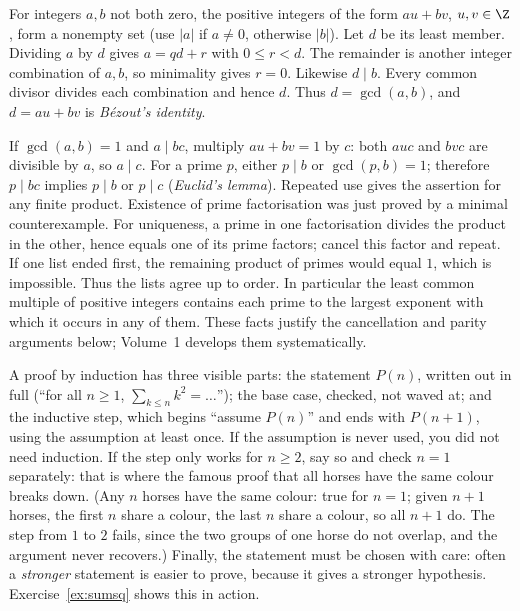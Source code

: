 For integers $a,b$ not both zero, the positive integers of the form $au+bv$, $u,v\in\Z$, form a nonempty set (use $|a|$ if $a\ne0$, otherwise $|b|$). Let $d$ be its least member. Dividing $a$ by $d$ gives $a=qd+r$ with $0\le r<d$. The remainder is another integer combination of $a,b$, so minimality gives $r=0$. Likewise $d\mid b$. Every common divisor divides each combination and hence $d$. Thus $d=\gcd(a,b)$, and $d=au+bv$ is \emph{B\'ezout's identity}.

If $\gcd(a,b)=1$ and $a\mid bc$, multiply $au+bv=1$ by $c$: both $auc$ and $bvc$ are divisible by $a$, so $a\mid c$. For a prime $p$, either $p\mid b$ or $\gcd(p,b)=1$; therefore $p\mid bc$ implies $p\mid b$ or $p\mid c$ (\emph{Euclid's lemma}). Repeated use gives the assertion for any finite product. Existence of prime factorisation was just proved by a minimal counterexample. For uniqueness, a prime in one factorisation divides the product in the other, hence equals one of its prime factors; cancel this factor and repeat. If one list ended first, the remaining product of primes would equal $1$, which is impossible. Thus the lists agree up to order. In particular the least common multiple of positive integers contains each prime to the largest exponent with which it occurs in any of them. These facts justify the cancellation and parity arguments below; Volume~1 develops them systematically.

\begin{reminder}
A proof by induction has three visible parts: the statement $P(n)$, written out in full (``for all $n\ge1$, $\sum_{k\le n}k^2=\dots$''); the base
case, checked, not waved at; and the inductive step, which begins ``assume $P(n)$'' and ends with $P(n+1)$, using the assumption at least once. If
the assumption is never used, you did not need induction. If the step only works for $n\ge2$, say so and check $n=1$ separately: that is where the
famous proof that all horses have the same colour breaks down. (Any $n$ horses have the same colour: true for $n=1$; given $n+1$ horses, the first $n$
share a colour, the last $n$ share a colour, so all $n+1$ do. The step from $1$ to $2$ fails, since the two groups of one horse do not overlap, and
the argument never recovers.) Finally, the statement must be chosen with care: often a \emph{stronger} statement is easier to prove, because it gives a
stronger hypothesis. Exercise~\ref{ex:sumsq} shows this in action.
\end{reminder}

